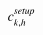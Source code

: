 

    \[\let\par\empty

    
{{{{\miitalic{c}}}\sb{{{\miitalic{k}}{\miitalic{,}}{\miitalic{h}}}}\sp{{\miitalic{setup}}}}}


    \]

  